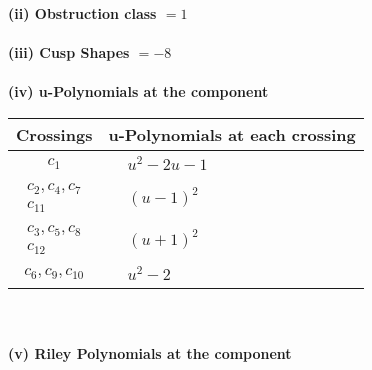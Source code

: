 \documentclass[1p]{elsarticle_modified}
\theoremstyle{definition}
\begin{document}
\flushleft \textbf{(ii) Obstruction class $= 1$}\\~\\
\flushleft \textbf{(iii) Cusp Shapes $= -8$}\\~\\
\newpage\renewcommand{\arraystretch}{1}
\flushleft \textbf{(iv) u-Polynomials at the component}\newline \\
\begin{tabular}{m{50pt}|m{274pt}}
Crossings & \hspace{64pt}u-Polynomials at each crossing \\
\hline $$\begin{aligned}c_{1}\end{aligned}$$&$\begin{aligned}
&u^2-2 u-1
\end{aligned}$\\
\hline $$\begin{aligned}c_{2},c_{4},c_{7}\\c_{11}\end{aligned}$$&$\begin{aligned}
&(u-1)^2
\end{aligned}$\\
\hline $$\begin{aligned}c_{3},c_{5},c_{8}\\c_{12}\end{aligned}$$&$\begin{aligned}
&(u+1)^2
\end{aligned}$\\
\hline $$\begin{aligned}c_{6},c_{9},c_{10}\end{aligned}$$&$\begin{aligned}
&u^2-2
\end{aligned}$\\
\hline
\end{tabular}\\~\\
\newpage\renewcommand{\arraystretch}{1}
\flushleft \textbf{(v) Riley Polynomials at the component}\newline \\
\end{document}
